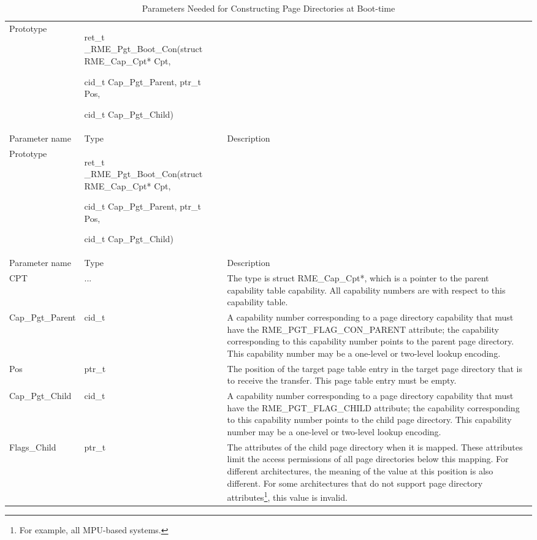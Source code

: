 \begin{xltabular}{\textwidth}{@{}>{\hsize\raggedright\arraybackslash}X>{\hsize\raggedright\arraybackslash}X>{\hsize\raggedright\arraybackslash}X@{}}
\caption{Parameters Needed for Constructing Page Directories at Boot-time}\label{tab:7-47-construct-page-directory-at-boot-parameters}\\
\toprule
Prototype\strut
 & ret\_t \_RME\_Pgt\_Boot\_Con(struct RME\_Cap\_Cpt* Cpt,

cid\_t Cap\_Pgt\_Parent, ptr\_t Pos,

cid\_t Cap\_Pgt\_Child)\strut
 & \strut
\tabularnewline
Parameter name & Type & Description\tabularnewline
\endfirsthead
\toprule
Prototype\strut
 & ret\_t \_RME\_Pgt\_Boot\_Con(struct RME\_Cap\_Cpt* Cpt,

cid\_t Cap\_Pgt\_Parent, ptr\_t Pos,

cid\_t Cap\_Pgt\_Child)\strut
 & \strut
\tabularnewline
Parameter name & Type & Description\tabularnewline
\midrule
\endhead
\bottomrule
\endlastfoot
CPT & ... &
The type is struct RME\_Cap\_Cpt*, which is a pointer to the parent capability table capability. All capability numbers are with respect to this capability table.\tabularnewline
Cap\_Pgt\_Parent & cid\_t &
A capability number corresponding to a page directory capability that must have the RME\_PGT\_FLAG\_CON\_PARENT attribute; the capability corresponding to this capability number points to the parent page directory. This capability number may be a one-level or two-level lookup encoding.\tabularnewline
Pos & ptr\_t &
The position of the target page table entry in the target page directory that is to receive the transfer. This page table entry must be empty.\tabularnewline
Cap\_Pgt\_Child & cid\_t &
A capability number corresponding to a page directory capability that must have the RME\_PGT\_FLAG\_CHILD attribute; the capability corresponding to this capability number points to the child page directory. This capability number may be a one-level or two-level lookup encoding.\tabularnewline
Flags\_Child & ptr\_t &
The attributes of the child page directory when it is mapped. These attributes limit the access permissions of all page directories below this mapping. For different architectures, the meaning of the value at this position is also different. For some architectures that do not support page directory attributes\footnote{For example, all MPU-based systems.}, this value is invalid.\tabularnewline
\end{xltabular}
\nopagebreak[4]

